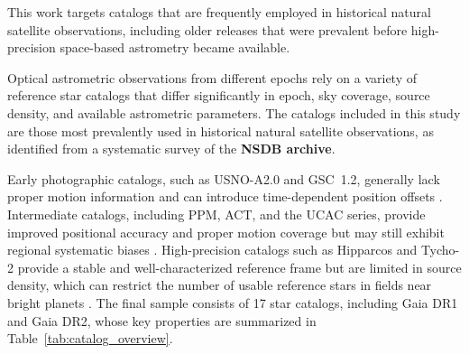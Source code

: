 \documentclass[linenumbers,amsmath,manuscript]{aastex702}
\begin{document}
This work targets catalogs that are frequently employed in historical natural satellite observations, including older releases that were prevalent before high-precision space-based astrometry became available.

Optical astrometric observations from different epochs rely on a variety of reference star catalogs that differ significantly in epoch, sky coverage, source density, and available astrometric parameters. The catalogs included in this study are those most prevalently used in historical natural satellite observations, as identified from a systematic survey of the \textbf{NSDB archive}.

Early photographic catalogs, such as USNO-A2.0 and GSC~1.2, generally lack proper motion information and can introduce time-dependent position offsets \citep{Monet1998USNOA2,Morrison2001GSC12}. Intermediate catalogs, including PPM, ACT, and the UCAC series, provide improved positional accuracy and proper motion coverage but may still exhibit regional systematic biases \citep{Roeser1991PPM,Urban1998ACT,Zacharias2004UCAC2,Zacharias2013UCAC4}. High-precision catalogs such as Hipparcos and Tycho-2 provide a stable and well-characterized reference frame but are limited in source density, which can restrict the number of usable reference stars in fields near bright planets \citep{ESA1997Hipparcos,Hog2000Tycho2}. The final sample consists of 17 star catalogs, including Gaia DR1 and Gaia DR2, whose key properties are summarized in Table~\ref{tab:catalog_overview}.
\end{document}
